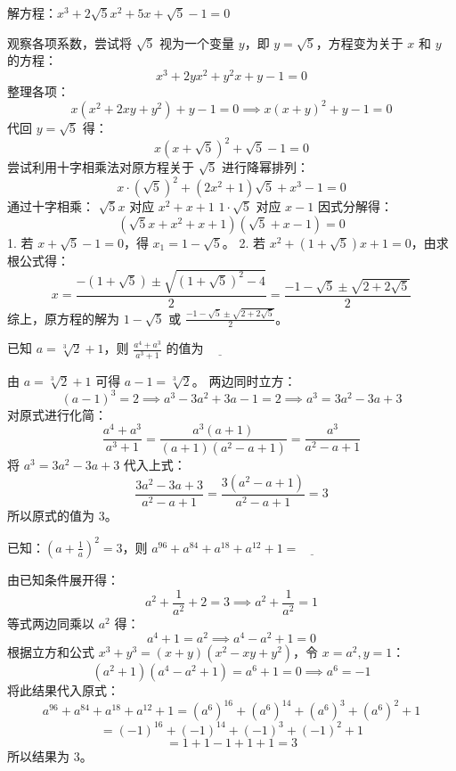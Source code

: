 \begin{questions}
\question
解方程：$x^3 + 2\sqrt{5}x^2 + 5x + \sqrt{5} - 1 = 0$

\begin{solution}
观察各项系数，尝试将 $\sqrt{5}$ 视为一个变量 $y$，即 $y = \sqrt{5}$，方程变为关于 $x$ 和 $y$ 的方程：
\[
x^3 + 2yx^2 + y^2x + y - 1 = 0
\]
整理各项：
\[
x(x^2 + 2xy + y^2) + y - 1 = 0 \implies x(x + y)^2 + y - 1 = 0
\]
代回 $y = \sqrt{5}$ 得：
\[
x(x + \sqrt{5})^2 + \sqrt{5} - 1 = 0
\]
尝试利用十字相乘法对原方程关于 $\sqrt{5}$ 进行降幂排列：
\[
x \cdot (\sqrt{5})^2 + (2x^2 + 1)\sqrt{5} + x^3 - 1 = 0
\]
通过十字相乘：
$\sqrt{5}x$ 对应 $x^2 + x + 1$
$1 \cdot \sqrt{5}$ 对应 $x - 1$
因式分解得：
\[
(\sqrt{5}x + x^2 + x + 1)(\sqrt{5} + x - 1) = 0
\]
1. 若 $x + \sqrt{5} - 1 = 0$，得 $x_1 = 1 - \sqrt{5}$。
2. 若 $x^2 + (1 + \sqrt{5})x + 1 = 0$，由求根公式得：
\[
x = \frac{-(1 + \sqrt{5}) \pm \sqrt{(1 + \sqrt{5})^2 - 4}}{2} = \frac{-1 - \sqrt{5} \pm \sqrt{2 + 2\sqrt{5}}}{2}
\]
综上，原方程的解为 $1 - \sqrt{5}$ 或 $\frac{-1 - \sqrt{5} \pm \sqrt{2 + 2\sqrt{5}}}{2}$。
\end{solution}

\question
已知 $a = \sqrt[3]{2} + 1$，则 $\frac{a^4 + a^3}{a^3 + 1}$ 的值为 $\underline{\qquad}$

\begin{solution}
由 $a = \sqrt[3]{2} + 1$ 可得 $a - 1 = \sqrt[3]{2}$。
两边同时立方：
\[
(a - 1)^3 = 2 \implies a^3 - 3a^2 + 3a - 1 = 2 \implies a^3 = 3a^2 - 3a + 3
\]
对原式进行化简：
\[
\frac{a^4 + a^3}{a^3 + 1} = \frac{a^3(a + 1)}{(a + 1)(a^2 - a + 1)} = \frac{a^3}{a^2 - a + 1}
\]
将 $a^3 = 3a^2 - 3a + 3$ 代入上式：
\[
\frac{3a^2 - 3a + 3}{a^2 - a + 1} = \frac{3(a^2 - a + 1)}{a^2 - a + 1} = 3
\]
所以原式的值为 $3$。
\end{solution}

\question
已知：$\left( a + \frac{1}{a} \right)^2 = 3$，则 $a^{96} + a^{84} + a^{18} + a^{12} + 1 = \underline{\qquad}$

\begin{solution}
由已知条件展开得：
\[
a^2 + \frac{1}{a^2} + 2 = 3 \implies a^2 + \frac{1}{a^2} = 1
\]
等式两边同乘以 $a^2$ 得：
\[
a^4 + 1 = a^2 \implies a^4 - a^2 + 1 = 0
\]
根据立方和公式 $x^3 + y^3 = (x + y)(x^2 - xy + y^2)$，令 $x = a^2, y = 1$：
\[
(a^2 + 1)(a^4 - a^2 + 1) = a^6 + 1 = 0 \implies a^6 = -1
\]
将此结果代入原式：
\[
a^{96} + a^{84} + a^{18} + a^{12} + 1 = (a^6)^{16} + (a^6)^{14} + (a^6)^3 + (a^6)^2 + 1
\]
\[
= (-1)^{16} + (-1)^{14} + (-1)^3 + (-1)^2 + 1
\]
\[
= 1 + 1 - 1 + 1 + 1 = 3
\]
所以结果为 $3$。
\end{solution}


\end{questions}
